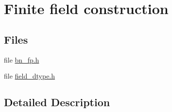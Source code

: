 \hypertarget{group__ff}{}\section{Finite field construction}
\label{group__ff}
\subsection*{Files}
\begin{DoxyCompactItemize}
\item 
file \hyperlink{bn__fp_8h}{bn\+\_\+fp.\+h}
\item 
file \hyperlink{field__dtype_8h}{field\+\_\+dtype.\+h}
\end{DoxyCompactItemize}


\subsection{Detailed Description}
